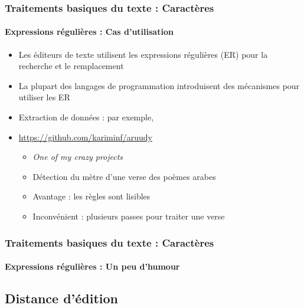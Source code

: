 \documentclass[xcolor=table]{beamer}
\begin{document}
\begin{frame}
\frametitle{Traitements basiques du texte : Caractères}
\framesubtitle{Expressions régulières : Cas d'utilisation}

\begin{itemize}
	\item Les éditeurs de texte utilisent les expressions régulières (ER) pour la recherche et le remplacement
	\item La plupart des langages de programmation introduisent des mécanismes pour utiliser les ER
	\item Extraction de données : par exemple, 
	\item \url{https://github.com/kariminf/aruudy}
	\begin{itemize}
		\item \textit{One of my crazy projects}
		\item Détection du mètre d'une verse des poèmes arabes
		\item Avantage : les règles sont lisibles
		\item Inconvénient : plusieurs passes pour traiter une verse 
	\end{itemize}
\end{itemize}

\end{frame}

\begin{frame}
\frametitle{Traitements basiques du texte : Caractères}
\framesubtitle{Expressions régulières : Un peu d'humour}

\begin{center}
\end{center}

\end{frame}

\subsection{Distance d'édition}
\end{document}
